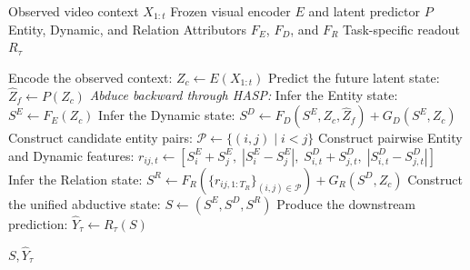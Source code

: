 \documentclass{article}
\begin{document}
\begin{algorithm}[t]
\caption{Abductive World Modeling}
\label{alg:awm}
\begin{algorithmic}[1]

\Require Observed video context $X_{1:t}$
\Require Frozen visual encoder $E$ and latent predictor $P$
\Require Entity, Dynamic, and Relation Attributors $F_E$, $F_D$, and $F_R$
\Require Task-specific readout $R_{\tau}$

\State Encode the observed context: $Z_c \gets E(X_{1:t})$
\State Predict the future latent state: $\widehat{Z}_f \gets P(Z_c)$
\State \textit{Abduce backward through HASP:}
\State Infer the Entity state: $S^E \gets F_E(Z_c)$
\State Infer the Dynamic state: $S^D \gets F_D(S^E,Z_c,\widehat{Z}_f)+G_D(S^E,Z_c)$
\State Construct candidate entity pairs: $\mathcal{P}\gets\{(i,j)\mid i<j\}$
        \State Construct pairwise Entity and Dynamic features:
        \Statex $r_{ij,t}\gets \left[S_i^E+S_j^E,\; |S_i^E-S_j^E|,\; S_{i,t}^D+S_{j,t}^D,\; |S_{i,t}^D-S_{j,t}^D|\right]$
    \EndFor
\EndFor
\State Infer the Relation state: $S^R \gets F_R(\{r_{ij,1:T_R}\}_{(i,j)\in\mathcal{P}})+G_R(S^D,Z_c)$
\State Construct the unified abductive state: $S\gets(S^E,S^D,S^R)$
\State Produce the downstream prediction: $\widehat{Y}_{\tau}\gets R_{\tau}(S)$

\State \Return $S,\widehat{Y}_{\tau}$

\end{algorithmic}
\end{algorithm}
\end{document}
